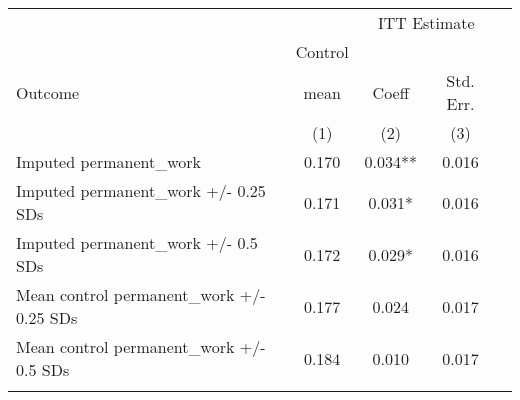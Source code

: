 \begin{tabular}{lcccc}
\hline \noalign{\smallskip} &  & \multicolumn{2}{c}{{ ITT Estimate}} & \\
\cline{3-4} & Control &  &  & \\
Outcome & mean & Coeff & Std. Err. & \\
 & (1) & (2) & (3) & \\
\noalign{\smallskip}\hline \noalign{\smallskip}Imputed permanent\_work & 0.170 & 0.034** & 0.016 & \\
Imputed permanent\_work +/- 0.25 SDs & 0.171 & 0.031* & 0.016 & \\
Imputed permanent\_work +/- 0.5 SDs & 0.172 & 0.029* & 0.016 & \\
Mean control permanent\_work +/- 0.25 SDs & 0.177 & 0.024 & 0.017 & \\
Mean control permanent\_work +/- 0.5 SDs & 0.184 & 0.010 & 0.017 & \\
\noalign{\smallskip}\hline\end{tabular}\\
